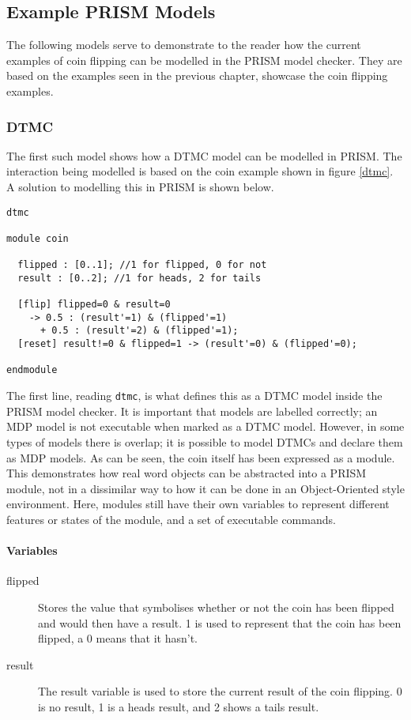 \documentclass{l4proj}
\begin{document}
\subsection{Example PRISM Models}

The following models serve to demonstrate to the reader how the current examples of coin flipping can be modelled in the PRISM model checker. They are based on the examples seen in the previous chapter, showcase the coin flipping examples.

\subsubsection{DTMC}

The first such model shows how a DTMC model can be modelled in PRISM. The interaction being modelled is based on the coin example shown in figure \ref{dtmc}. A solution to modelling this in PRISM is shown below.

\begin{verbatim}
dtmc

module coin

  flipped : [0..1]; //1 for flipped, 0 for not
  result : [0..2]; //1 for heads, 2 for tails

  [flip] flipped=0 & result=0 
    -> 0.5 : (result'=1) & (flipped'=1) 
      + 0.5 : (result'=2) & (flipped'=1);
  [reset] result!=0 & flipped=1 -> (result'=0) & (flipped'=0);
	
endmodule
\end{verbatim}

The first line, reading {\tt dtmc}, is what defines this as a DTMC model inside the PRISM model checker. It is important that models are labelled correctly; an MDP model is not executable when marked as a DTMC model. However, in some types of models there is overlap; it is possible to model DTMCs and declare them as MDP models.
As can be seen, the coin itself has been expressed as a module. This demonstrates how real word objects can be abstracted into a PRISM module, not in a dissimilar way to how it can be done in an Object-Oriented style environment. Here, modules still have their own variables to represent different features or states of the module, and a set of executable commands. 
\paragraph{Variables}
\begin{description}
\item[flipped] Stores the value that symbolises whether or not the coin has been flipped and would then have a result. 1 is used to represent that the coin has been flipped, a 0 means that it hasn't.
\item[result] The result variable is used to store the current result of the coin flipping. 0 is no result, 1 is a heads result, and 2 shows a tails result.
\end{description}
\end{document}
